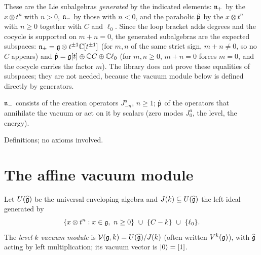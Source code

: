 \begin{dictionary}
These are the Lie subalgebras \emph{generated} by the indicated elements: $\mathfrak{n}_+$ by the
$x\otimes t^n$ with $n>0$, $\mathfrak{n}_-$ by those with $n<0$, and the parabolic $\hat{\mathfrak{p}}$ by the
$x\otimes t^n$ with $n\ge0$ together with $C$ and $\ell_0$. Since the loop bracket adds degrees and
the cocycle is supported on $m+n = 0$, the generated subalgebras are the expected subspaces:
$\mathfrak{n}_\pm = \mathfrak{g}\otimes t^{\pm1}{\mathbb{C}}[t^{\pm1}]$ (for $m,n$ of the same strict sign, $m+n\ne0$, so no $C$
appears) and $\hat{\mathfrak{p}} = \mathfrak{g}[t]\oplus{\mathbb{C}} C\oplus{\mathbb{C}}\ell_0$ (for $m,n\ge0$, $m+n = 0$ forces $m = 0$,
and the cocycle carries the factor $m$). The library does not prove these equalities of
subspaces; they are not needed, because the vacuum module below is defined directly by
generators.
\end{dictionary}

\begin{physics}
$\mathfrak{n}_-$ consists of the creation operators $J^a_{-n}$, $n\ge1$; $\hat{\mathfrak{p}}$ of the operators that
annihilate the vacuum or act on it by scalars (zero modes $J^a_0$, the level, the energy).
\end{physics}

\begin{status}
Definitions; no axioms involved.
\end{status}

\section{The affine vacuum module}\label{l02:sec:vacuum}

\begin{definition}\label{l02:def:vacuum}
Let $U(\widehat{\mathfrak{g}})$ be the universal enveloping algebra and $J(k)\subseteq U(\widehat{\mathfrak{g}})$ the left ideal
generated by
\begin{equation*}
 \{x\otimes t^n : x\in\mathfrak{g},\ n\ge0\}\ \cup\ \{C - k\}\ \cup\ \{\ell_0\}.
\end{equation*}
The \emph{level-$k$ vacuum module} is $\mathcal{V}(\mathfrak{g},k) = U(\widehat{\mathfrak{g}})/J(k)$ (often written
$V^k(\mathfrak{g})$), with $\widehat{\mathfrak{g}}$ acting by left multiplication; its vacuum vector is $|0\rangle = [1]$.
\end{definition}

